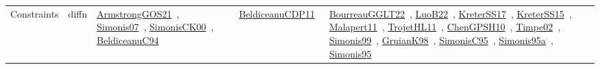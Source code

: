 {\begin{longtable}{lp{3cm}>{\raggedright\arraybackslash}p{6cm}>{\raggedright\arraybackslash}p{6cm}>{\raggedright\arraybackslash}p{8cm}}
Constraints & diffn & \href{../works/ArmstrongGOS21.pdf}{ArmstrongGOS21}~\cite{ArmstrongGOS21}, \href{../works/Simonis07.pdf}{Simonis07}~\cite{Simonis07}, \href{../works/SimonisCK00.pdf}{SimonisCK00}~\cite{SimonisCK00}, \href{../works/BeldiceanuC94.pdf}{BeldiceanuC94}~\cite{BeldiceanuC94} & \href{../works/BeldiceanuCDP11.pdf}{BeldiceanuCDP11}~\cite{BeldiceanuCDP11} & \href{../works/BourreauGGLT22.pdf}{BourreauGGLT22}~\cite{BourreauGGLT22}, \href{../works/LuoB22.pdf}{LuoB22}~\cite{LuoB22}, \href{../works/KreterSS17.pdf}{KreterSS17}~\cite{KreterSS17}, \href{../works/KreterSS15.pdf}{KreterSS15}~\cite{KreterSS15}, \href{../works/Malapert11.pdf}{Malapert11}~\cite{Malapert11}, \href{../works/TrojetHL11.pdf}{TrojetHL11}~\cite{TrojetHL11}, \href{../works/ChenGPSH10.pdf}{ChenGPSH10}~\cite{ChenGPSH10}, \href{../works/Timpe02.pdf}{Timpe02}~\cite{Timpe02}, \href{../works/Simonis99.pdf}{Simonis99}~\cite{Simonis99}, \href{../works/GruianK98.pdf}{GruianK98}~\cite{GruianK98}, \href{../works/SimonisC95.pdf}{SimonisC95}~\cite{SimonisC95}, \href{../works/Simonis95a.pdf}{Simonis95a}~\cite{Simonis95a}, \href{../works/Simonis95.pdf}{Simonis95}~\cite{Simonis95}\\

\end{longtable}}

